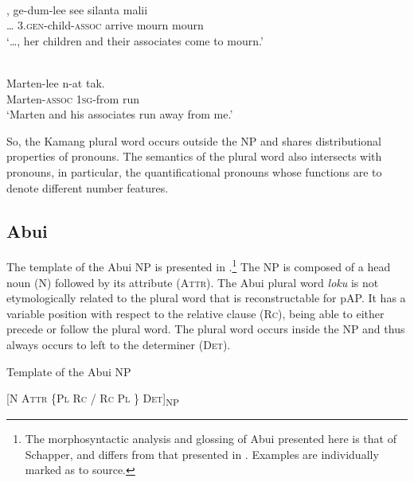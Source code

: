 \ea%
\label{ex:9:44}
 \\
\gll  {\dots},   ge-dum-lee see silanta malii \\
  {\dots} 3.\textsc{gen}-child-\textsc{assoc} arrive mourn mourn \\
\glt `{\dots}, her children and their associates come to mourn.'
\z







\ea%
\label{ex:9:45}
 \\
\gll  Marten-lee n-at tak.  \\
  Marten-\textsc{assoc} 1\textsc{sg}-from run   \\
\glt `Marten and his associates run away from me.'
\z






So, the Kamang plural word occurs outside the NP and shares distributional properties of pronouns. The semantics of the plural word also intersects with pronouns, in particular, the quantificational pronouns whose functions are to denote different number features.

\subsection{Abui} %
\label{sec:9:3.4}
The template of the Abui NP is presented in .\footnote{The morphosyntactic analysis and glossing of Abui presented here is that of Schapper, and differs from that presented in \citet{Kratochvil2007}. Examples are individually marked as to source.} The NP is composed of a head noun (N) followed by its attribute (\textsc{Attr).} The Abui plural word \textit{loku} is not etymologically related to the plural word that is reconstructable for pAP. It has a variable position with respect to the relative clause (\textsc{Rc}), being able to either precede or follow the plural word. The plural word occurs inside the NP and thus always occurs to left to the determiner (\textsc{Det).}

\ea%
\label{ex:9:46}
\upshape 
 Template of the Abui NP

[\textsc{N  Attr  \{Pl  Rc  /  Rc  Pl \} Det}]\textsubscript{\upshape NP}
\z

